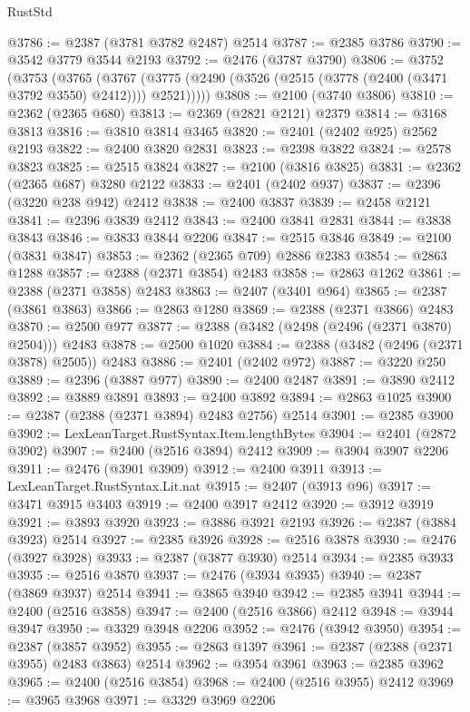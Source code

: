 \begin{lexlean}{RustStd}
\begin{coremodule}
{\begin{coremodule}
{{{{{{{{{{{{{{{{{{{{{{{{{{{{{{{{{{{{{{{{{{{{{{{{{{@3786 := @2387 (@3781 @3782 @2487) @2514
@3787 := @2385 @3786
@3790 := @3542 @3779 @3544 @2193
@3792 := @2476 (@3787 @3790)
@3806 := @3752
    (@3753
      (@3765
        (@3767 (@3775 (@2490 (@3526 (@2515 (@3778 (@2400 (@3471 @3792 @3550) @2412)))) @2521)))))
@3808 := @2100 (@3740 @3806)
@3810 := @2362 (@2365 @680)
@3813 := @2369 (@2821 @2121) @2379
@3814 := @3168 @3813
@3816 := @3810 @3814 @3465
@3820 := @2401 (@2402 @925) @2562 @2193
@3822 := @2400 @3820 @2831
@3823 := @2398 @3822
@3824 := @2578 @3823
@3825 := @2515 @3824
@3827 := @2100 (@3816 @3825)
@3831 := @2362 (@2365 @687) @3280 @2122
@3833 := @2401 (@2402 @937)
@3837 := @2396 (@3220 @238 @942) @2412
@3838 := @2400 @3837
@3839 := @2458 @2121
@3841 := @2396 @3839 @2412
@3843 := @2400 @3841 @2831
@3844 := @3838 @3843
@3846 := @3833 @3844 @2206
@3847 := @2515 @3846
@3849 := @2100 (@3831 @3847)
@3853 := @2362 (@2365 @709) @2886 @2383
@3854 := @2863 @1288
@3857 := @2388 (@2371 @3854) @2483
@3858 := @2863 @1262
@3861 := @2388 (@2371 @3858) @2483
@3863 := @2407 (@3401 @964)
@3865 := @2387 (@3861 @3863)
@3866 := @2863 @1280
@3869 := @2388 (@2371 @3866) @2483
@3870 := @2500 @977
@3877 := @2388 (@3482 (@2498 (@2496 (@2371 @3870) @2504))) @2483
@3878 := @2500 @1020
@3884 := @2388 (@3482 (@2496 (@2371 @3878) @2505)) @2483
@3886 := @2401 (@2402 @972)
@3887 := @3220 @250
@3889 := @2396 (@3887 @977)
@3890 := @2400 @2487
@3891 := @3890 @2412
@3892 := @3889 @3891
@3893 := @2400 @3892
@3894 := @2863 @1025
@3900 := @2387 (@2388 (@2371 @3894) @2483 @2756) @2514
@3901 := @2385 @3900
@3902 := LexLeanTarget.RustSyntax.Item.lengthBytes
@3904 := @2401 (@2872 @3902)
@3907 := @2400 (@2516 @3894) @2412
@3909 := @3904 @3907 @2206
@3911 := @2476 (@3901 @3909)
@3912 := @2400 @3911
@3913 := LexLeanTarget.RustSyntax.Lit.nat
@3915 := @2407 (@3913 @96)
@3917 := @3471 @3915 @3403
@3919 := @2400 @3917 @2412
@3920 := @3912 @3919
@3921 := @3893 @3920
@3923 := @3886 @3921 @2193
@3926 := @2387 (@3884 @3923) @2514
@3927 := @2385 @3926
@3928 := @2516 @3878
@3930 := @2476 (@3927 @3928)
@3933 := @2387 (@3877 @3930) @2514
@3934 := @2385 @3933
@3935 := @2516 @3870
@3937 := @2476 (@3934 @3935)
@3940 := @2387 (@3869 @3937) @2514
@3941 := @3865 @3940
@3942 := @2385 @3941
@3944 := @2400 (@2516 @3858)
@3947 := @2400 (@2516 @3866) @2412
@3948 := @3944 @3947
@3950 := @3329 @3948 @2206
@3952 := @2476 (@3942 @3950)
@3954 := @2387 (@3857 @3952)
@3955 := @2863 @1397
@3961 := @2387 (@2388 (@2371 @3955) @2483 @3863) @2514
@3962 := @3954 @3961
@3963 := @2385 @3962
@3965 := @2400 (@2516 @3854)
@3968 := @2400 (@2516 @3955) @2412
@3969 := @3965 @3968
@3971 := @3329 @3969 @2206
}}}}}}}}}}}}}}}}}}}}}}}}}}}}}}}}}}}}}}}}}}}}}}}}}}
\end{coremodule}}
\end{coremodule}
\end{lexlean}
